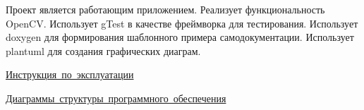 Проект является работающим приложением. Реализует функциональность Open\+CV. Использует g\+Test в качестве фреймворка для тестирования. Использует doxygen для формирования шаблонного примера самодокументации. Использует plantuml для создания графических диаграм.


\begin{DoxyItemize}
\item \mbox{\hyperlink{manual_page}{Инструкция по эксплуатации}}
\item \mbox{\hyperlink{diagram_page}{Диаграммы структуры программного обеспечения}} 
\end{DoxyItemize}